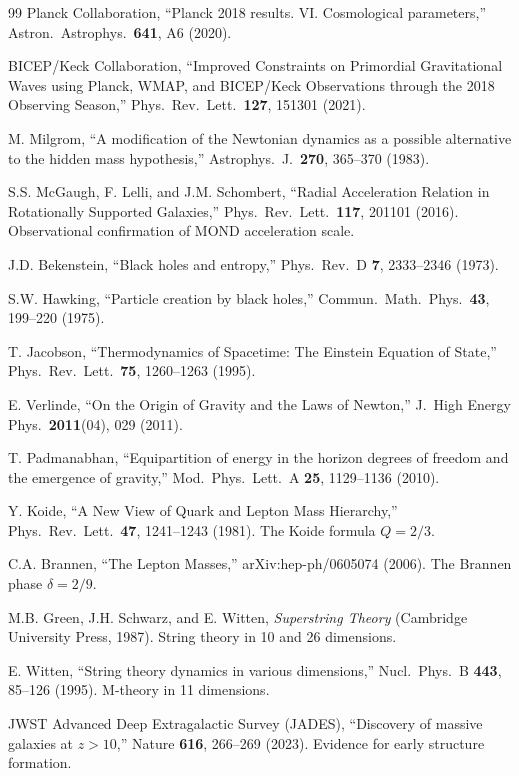 \documentclass[11pt,a4paper]{article}
\theoremstyle{plain}
\theoremstyle{definition}
\theoremstyle{remark}
\begin{document}
\begin{thebibliography}{99}
 Planck Collaboration, ``Planck 2018 results. VI. Cosmological parameters,'' Astron.\ Astrophys.\ \textbf{641}, A6 (2020).

 BICEP/Keck Collaboration, ``Improved Constraints on Primordial Gravitational Waves using Planck, WMAP, and BICEP/Keck Observations through the 2018 Observing Season,'' Phys.\ Rev.\ Lett.\ \textbf{127}, 151301 (2021).

 M. Milgrom, ``A modification of the Newtonian dynamics as a possible alternative to the hidden mass hypothesis,'' Astrophys.\ J.\ \textbf{270}, 365--370 (1983).

 S.S. McGaugh, F. Lelli, and J.M. Schombert, ``Radial Acceleration Relation in Rotationally Supported Galaxies,'' Phys.\ Rev.\ Lett.\ \textbf{117}, 201101 (2016). Observational confirmation of MOND acceleration scale.

 J.D. Bekenstein, ``Black holes and entropy,'' Phys.\ Rev.\ D \textbf{7}, 2333--2346 (1973).

 S.W. Hawking, ``Particle creation by black holes,'' Commun.\ Math.\ Phys.\ \textbf{43}, 199--220 (1975).

 T. Jacobson, ``Thermodynamics of Spacetime: The Einstein Equation of State,'' Phys.\ Rev.\ Lett.\ \textbf{75}, 1260--1263 (1995).

 E. Verlinde, ``On the Origin of Gravity and the Laws of Newton,'' J.\ High Energy Phys.\ \textbf{2011}(04), 029 (2011).

 T. Padmanabhan, ``Equipartition of energy in the horizon degrees of freedom and the emergence of gravity,'' Mod.\ Phys.\ Lett.\ A \textbf{25}, 1129--1136 (2010).

 Y. Koide, ``A New View of Quark and Lepton Mass Hierarchy,'' Phys.\ Rev.\ Lett.\ \textbf{47}, 1241--1243 (1981). The Koide formula $Q = 2/3$.

 C.A. Brannen, ``The Lepton Masses,'' arXiv:hep-ph/0605074 (2006). The Brannen phase $\delta = 2/9$.

 M.B. Green, J.H. Schwarz, and E. Witten, \emph{Superstring Theory} (Cambridge University Press, 1987). String theory in 10 and 26 dimensions.

 E. Witten, ``String theory dynamics in various dimensions,'' Nucl.\ Phys.\ B \textbf{443}, 85--126 (1995). M-theory in 11 dimensions.

 JWST Advanced Deep Extragalactic Survey (JADES), ``Discovery of massive galaxies at $z > 10$,'' Nature \textbf{616}, 266--269 (2023). Evidence for early structure formation.

\end{thebibliography}
\end{document}
